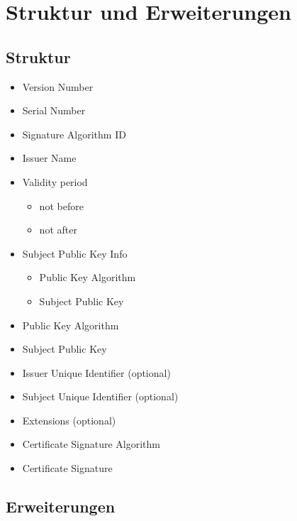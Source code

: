 \chapter{Struktur und Erweiterungen}
\section{Struktur}

  \begin{itemize}
      \item Version Number
      \item Serial Number
      \item Signature Algorithm ID
      \item Issuer Name
      \item Validity period
      \begin{itemize}
          \item not before
          \item not after
      \end{itemize}
      \item Subject Public Key Info
      \begin{itemize}
          \item Public Key Algorithm
          \item Subject Public Key
      \end{itemize}
      \item Public Key Algorithm
      \item Subject Public Key
      \item Issuer Unique Identifier (optional)
      \item Subject Unique Identifier (optional)
      \item Extensions (optional)
      \item Certificate Signature Algorithm
      \item Certificate Signature
  \end{itemize}


\section{Erweiterungen}

